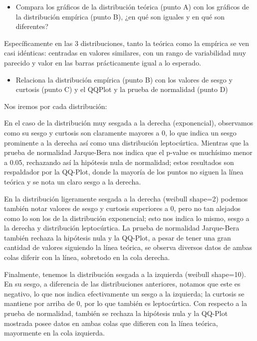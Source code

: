 \documentclass[
]{article}
\providecommand{\tightlist}{%
  \setlength{\itemsep}{0pt}\setlength{\parskip}{0pt}}
\begin{document}
\begin{itemize}
\tightlist
\item
  Compara los gráficos de la distribución teórica (punto A) con los
  gráficos de la distribución empírica (punto B), ¿en qué son iguales y
  en qué son diferentes?
\end{itemize}

Específicamente en las 3 distribuciones, tanto la teórica como la
empírica se ven casi idénticas: centradas en valores similares, con un
rango de variabilidad muy parecido y valor en las barras prácticamente
igual a lo esperado.

\begin{itemize}
\tightlist
\item
  Relaciona la distribución empírica (punto B) con los valores de sesgo
  y curtosis (punto C) y el QQPlot y la prueba de normalidad (punto D)
\end{itemize}

Nos iremos por cada distribución:

En el caso de la distribución muy sesgada a la derecha (exponencial),
observamos como su sesgo y curtosis son claramente mayores a 0, lo que
indica un sesgo prominente a la derecha así como una distribución
leptocúrtica. Mientras que la prueba de normalidad Jarque-Bera nos
indica que el p-value es muchísimo menor a 0.05, rechazando así la
hipótesis nula de normalidad; estos resultados son respaldador por la
QQ-Plot, donde la mayoría de los puntos no siguen la línea teórica y se
nota un claro sesgo a la derecha.

En la distribución ligeramente sesgada a la derecha (weibull shape=2)
podemos también notar valores de sesgo y curtosis superiores a 0, pero
no tan alejados como lo son los de la distribución exponencial; esto nos
indica lo mismo, sesgo a la derecha y distribución leptocúrtica. La
prueba de normalidad Jarque-Bera también rechaza la hipótesis nula y la
QQ-Plot, a pesar de tener una gran cantidad de valores siguiendo la
línea teórica, se observa diversos datos de ambas colas diferir con la
línea, sobretodo en la cola derecha.

Finalmente, tenemos la distribución sesgada a la izquierda (weibull
shape=10). En su sesgo, a diferencia de las distribuciones anteriores,
notamos que este es negativo, lo que nos indica efectivamente un sesgo a
la izquierda; la curtosis se mantiene por arriba de 0, por lo que
también es leptocúrtica. Con respecto a la prueba de normalidad, también
se rechaza la hipótesis nula y la QQ-Plot mostrada posee datos en ambas
colas que difieren con la línea teórica, mayormente en la cola
izquierda.
\end{document}
